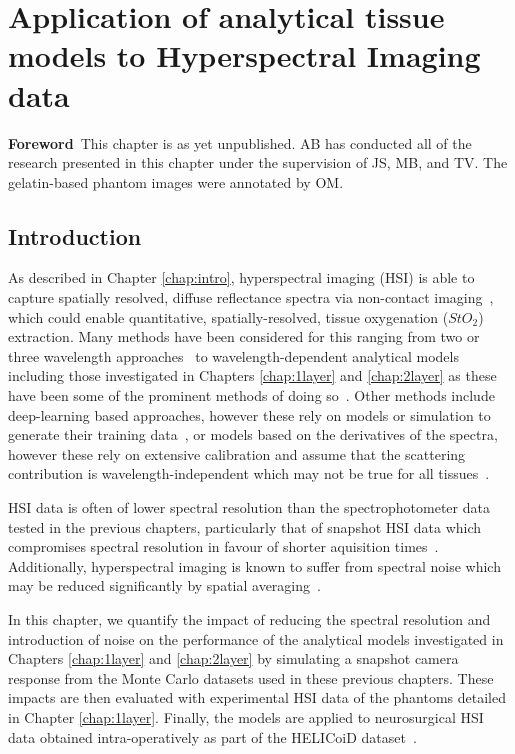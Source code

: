 \chapter[Application of models to HSI data]{Application of analytical tissue models to Hyperspectral Imaging data}\label{chap:HSImodel}
\begin{center}
\begin{minipage}[b]{0.9\linewidth}
\small
\textbf{Foreword\,}
This chapter is as yet unpublished. 
\newline
AB has conducted all of the research presented in this chapter under the supervision of JS, MB, and TV. The gelatin-based phantom images were annotated by OM. 
\end{minipage}
\end{center}

\minitoc

\section{Introduction}
As described in Chapter \ref{chap:intro}, hyperspectral imaging (HSI) is able to capture spatially resolved, diffuse reflectance spectra via non-contact imaging~\citep{Lu2014,Giannoni2018,Calin2014,Shapey2019}, which could enable quantitative, spatially-resolved, tissue oxygenation ($StO_2$) extraction. Many methods have been considered for this ranging from two or three wavelength approaches~\citep{MacKenzie2018} to wavelength-dependent analytical models including those investigated in Chapters \ref{chap:1layer} and \ref{chap:2layer} as these have been some of the prominent methods of doing so~\citep{Yudovsky2009, Jacques1999, Clancy2015, Clancy2020}. Other methods include deep-learning based approaches, however these rely on models or simulation to generate their training data~\citep{Wirkert2016}, or models based on the derivatives of the spectra, however these rely on extensive calibration and assume that the scattering contribution is wavelength-independent which may not be true for all tissues~\citep{Holmer2018}.

HSI data is often of lower spectral resolution than the spectrophotometer data tested in the previous chapters, particularly that of snapshot HSI data which compromises spectral resolution in favour of shorter aquisition times~\citep{Geelen2014}. Additionally, hyperspectral imaging is known to suffer from spectral noise which may be reduced significantly by spatial averaging~\citep{Zhang2020}.

In this chapter, we quantify the impact of reducing the spectral resolution and introduction of noise on the performance of the analytical models investigated in Chapters \ref{chap:1layer} and \ref{chap:2layer} by simulating a snapshot camera response from the Monte Carlo datasets used in these previous chapters. These impacts are then evaluated with experimental HSI data of the phantoms detailed in Chapter \ref{chap:1layer}. Finally, the models are applied to neurosurgical HSI data obtained intra-operatively as part of the HELICoiD dataset~\cite{Fabelo2019}. %

